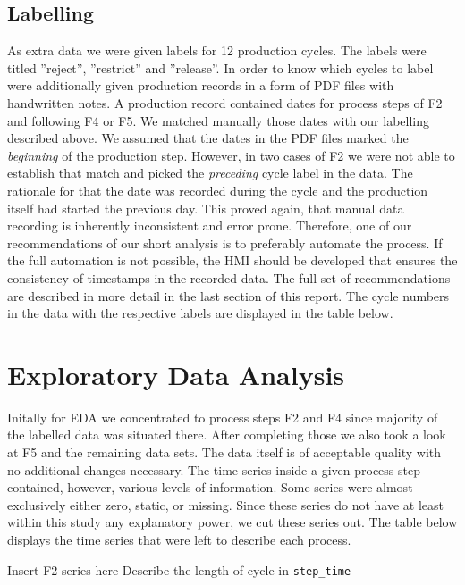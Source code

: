 \documentclass{article}
\begin{document}
\subsection{Labelling}
As extra data we were given labels for 12 production cycles. The labels were titled ''reject'', ''restrict'' and ''release''. In order to know which cycles to label were additionally given production records in a form of PDF files with handwritten notes. A production record contained dates for process steps of F2 and following F4 or F5. We matched manually those dates with our labelling described above. We assumed that the dates in the PDF files marked the \emph{beginning} of the production step. However, in two cases of F2 we were not able to establish that match and picked the \emph{preceding} cycle label in the data. The rationale for that the date was recorded during the cycle and the production itself had started the previous day. This proved again, that manual data recording is inherently inconsistent and error prone. Therefore, one of our recommendations of our short analysis is to preferably automate the process. If the full automation is not possible, the HMI should be developed that ensures the consistency of timestamps in the recorded data. The full set of recommendations are described in more detail in the last section of this report. The cycle numbers in the data with the respective labels are displayed in the table below.


\section{Exploratory Data Analysis}
Initally for EDA we concentrated to process steps F2 and F4 since majority of the labelled data was situated there. After completing those we also took a look at F5 and the remaining data sets. The data itself is of acceptable quality with no additional changes necessary. The time series inside a given process step contained, however, various levels of information. Some series were almost exclusively either zero, static, or missing. Since these series do not have at least within this study any explanatory power, we cut these series out. The table below displays the time series that were left to describe each process.

Insert F2 series here
Describe the length of cycle in \texttt{step\_time}
\end{document}
